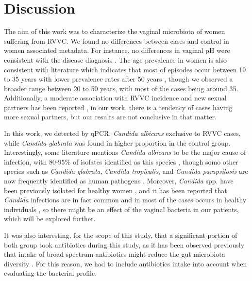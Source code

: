 \documentclass[biotech,article,submit,pdftex,moreauthors]{Definitions/mdpi}
\begin{document}


\section{Discussion}

The aim of this work was to characterize the vaginal microbiota of women suffering from RVVC. We found no differences between cases and control in women associated metadata. For instance, no differences in vaginal pH were consistent with the disease diagnosis \cite{@sobelVulvovaginalCandidosis2007}. The age prevalence in women is also consistent with literature which indicates that most of episodes occur between 19 to 35 years with lower prevalence rates after 50 years \cite{@blosteinRecurrentVulvovaginalCandidiasis2017}, though we observed a broader range between 20 to 50 years, with most of the cases being around 35. Additionally, a moderate association with RVVC incidence and new sexual partners has been reported \cite{@yanoCurrentPatientPerspectives2019}, in our work, there is a tendency of cases having more sexual partners, but our results are not conclusive in that matter.

In this work, we detected by qPCR, \textit{Candida albicans} exclusive to RVVC cases, while \textit{Candida glabrata} was found in higher proportion in the control group. Interestingly, some literature mentions \textit{Candida albicans} to be the major cause of infection, with 80-95\% of isolates identified as this species \cite{@sobelVulvovaginalCandidosis2007a}, though somo other species such as \textit{Candida glabrata}, \textit{Candida tropicalis}, and \textit{Candida parapsilosis} are now frequently identified as human pathogens \cite{@silvaCandidaGlabrataCandida2012}. Moreover, \textit{Candida} spp. have been previously isolated for healthy women \cite{@goldacreVaginalMicrobialFlora1979; @chowVaginalColonizationEscherichia1986}, and it has been reported that \textit{Candida} infections are in fact common and in most of the cases occurs in healthy individuals \cite{@gowImportanceCandidaAlbicans2012}, so there might be an effect of the vaginal bacteria in our patients, which will be explored further.

It was also interesting, for the scope of this study, that a significant portion of both group took antibiotics during this study, as it has been observed previously that intake of broad-spectrum antibiotics might reduce the gut microbiota diversity \cite{@dubourgCulturomicsPyrosequencingEvidence2014}. For this reason, we had to include antibiotics intake into account when evaluating the bacterial profile.
\end{document}
